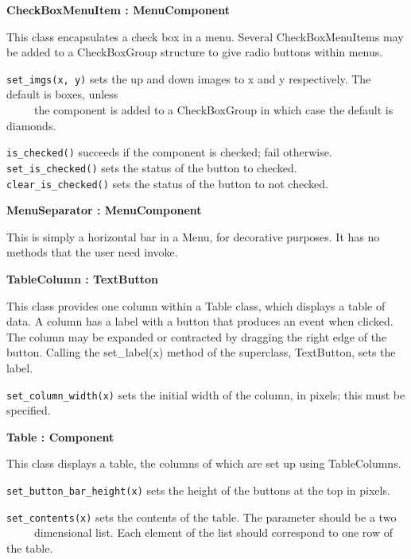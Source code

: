 {\ttfamily\bfseries
{}CheckBoxMenuItem : MenuComponent}

This class encapsulates a check box in a menu. Several CheckBoxMenuItems
may be added to a CheckBoxGroup structure to give {\textquotedbl}radio
buttons{\textquotedbl} within menus.

\texttt{set\_imgs(x, y)} sets the up and down images to x and y respectively.
The default is boxes, unless\\
 \ \ \ \ \ the component is added to a CheckBoxGroup in which case the
default is diamonds.

\texttt{is\_checked()} succeeds if the component is checked; fail
otherwise.\\
\texttt{set\_is\_checked()} sets the status of the button to checked.\\
\texttt{clear\_is\_checked()} sets the status of the button to not checked.

{\ttfamily\bfseries
{}MenuSeparator : MenuComponent}

This is simply a horizontal bar in a Menu, for decorative purposes. It
has no methods that the user need invoke.

{\ttfamily\bfseries
{}TableColumn : TextButton}

This class provides one column within a Table class, which displays a
table of data. A column has a label with a button that produces an
event when clicked. The column may be expanded or contracted by
dragging the right edge of the button. Calling the set\_label(x) method
of the superclass, TextButton, sets the label.

\texttt{set\_column\_width(x)} sets the initial width of the column, in pixels;
this must be specified.


{\ttfamily\bfseries
{}Table : Component}

This class displays a table, the columns of which are set up using
TableColumns.

\texttt{set\_button\_bar\_height(x)} sets the height of the buttons at the top
in pixels.

\texttt{set\_contents(x)} sets the contents of the table. The parameter should be
a two\\
 \ \ \ \ \ dimensional list. Each element of the list should correspond
to one row of the table.

